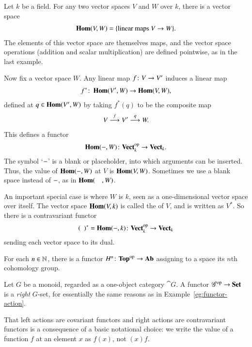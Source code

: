 \begin{example}
\label{eg:fns-on-vs}
Let $k$ be a field.  For any two vector spaces $V$ and $W$ over $k$, there
is a vector space
\[
\HOM(V, W)
=
\{ \text{linear maps } V \to W \}.%
%
\index{vector space!linear maps@of linear maps}
%
\ntn{HOM}
%
\]
The elements of this vector space are themselves maps, and the vector space
operations (addition and scalar multiplication) are defined pointwise, as
in the last example.

Now fix a vector space $W$.  Any linear map $f\from V \to V'$ induces a linear
map
\[
f^*\from \HOM(V', W) \to \HOM(V, W),%
%
\ntn{dual-map}
%
\]
defined at $q\in \operatorname{\mathbf{Hom}}(V', W)$ by taking $f^*(q)$ to be the composite map
\[
V \stackrel{f}{\longrightarrow} V' \stackrel{q}{\longrightarrow} W.
\]
This defines a functor
\[
\HOM(\dashbk, W)\from \Vect_k^\op \to \Vect_k.
\]
The symbol `$-$'%
%
%
is a blank or placeholder, into which arguments can be inserted.  Thus, the
value of $\operatorname{\mathbf{Hom}}(-, W)$ at $V$ is $\operatorname{\mathbf{Hom}}(V, W)$.  Sometimes we use a
blank space%
%
%
instead of $-$, as in $\operatorname{\mathbf{Hom}}(\hspace*{1em}, W)$.

An important special case is where $W$ is $k$, seen as a one-dimensional
vector space over itself.  The vector space $\operatorname{\mathbf{Hom}}(V, k)$ is called the
%
%
%
%
%
of $V$, and is written as $V^*$.%
%
%
So there is a contravariant functor
\[
\blank^* = \HOM(\dashbk, k)\from \Vect_k^\op \to \Vect_k
\]
sending each vector space to its dual.
\end{example}

\begin{example}
For each $n\in\mathbb{N}$, there is a functor $H^n\from  \Tp^\op
\to \Ab$%
%
%
assigning to a space its $n$th cohomology%
%
%
group.
\end{example}

\begin{example}
\label{eg:contra-functors:actions}
Let $G$ be a monoid, regarded as a one-object category $\cat{G}$.  A
functor $\mathscr{G}^{\mathrm{op}} \to \mathbf{Set}$ is a \emph{right} $G$-set,%
%
%
for essentially the same reasons as in Example~\ref{eg:functor-action}.

That left actions are covariant functors and right actions are
contravariant functors is a consequence of a basic notational choice: we
write the value of a function $f$ at an element $x$ as $f(x)$, not $(x)f$.
\end{example}

